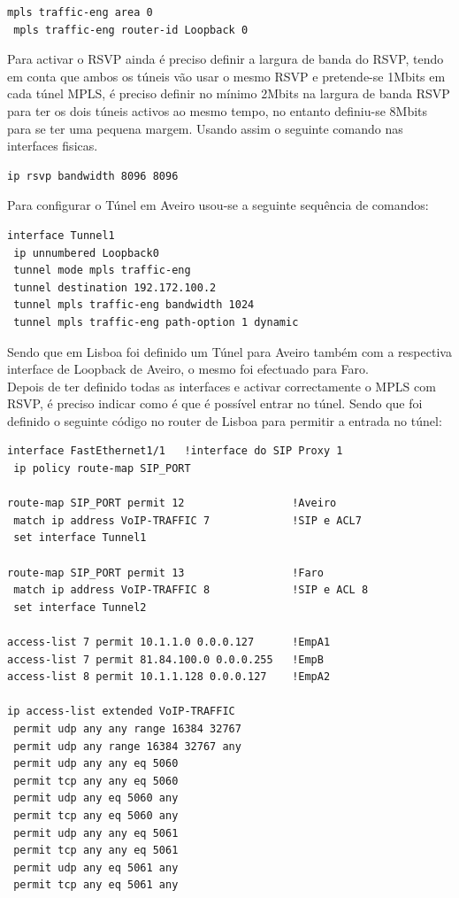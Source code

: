 \documentclass[11pt,a4paper]{report}
\begin{document}
\begin{lstlisting}[caption=MPLS Tunnel - Activar MPLS TE no OSPF]
 mpls traffic-eng area 0
 mpls traffic-eng router-id Loopback 0
\end{lstlisting}

Para activar o RSVP ainda é preciso definir a largura de banda do RSVP, tendo em conta que ambos os túneis vão usar o mesmo RSVP e pretende-se 1Mbits em cada túnel MPLS, é preciso definir no mínimo 2Mbits na largura de banda RSVP para ter os dois túneis activos ao mesmo tempo, no entanto definiu-se 8Mbits para se ter uma pequena margem. Usando assim o seguinte comando nas interfaces fisicas.\\

\begin{lstlisting}[caption=MPLS Tunnel - Activar RSVP]
ip rsvp bandwidth 8096 8096
\end{lstlisting}

Para configurar o Túnel em Aveiro usou-se a seguinte sequência de comandos:\\
\begin{lstlisting}[caption=MPLS Tunnel - Aveiro]
interface Tunnel1
 ip unnumbered Loopback0
 tunnel mode mpls traffic-eng
 tunnel destination 192.172.100.2
 tunnel mpls traffic-eng bandwidth 1024
 tunnel mpls traffic-eng path-option 1 dynamic
\end{lstlisting}

Sendo que em Lisboa foi definido um Túnel para Aveiro também com a respectiva interface de Loopback de Aveiro, o mesmo foi efectuado para Faro.\\

Depois de ter definido todas as interfaces e activar correctamente o MPLS com RSVP, é preciso indicar como é que é possível entrar no túnel. Sendo que foi definido o seguinte código no router de Lisboa para permitir a entrada no túnel:\\

\begin{lstlisting}[caption=MPLS Tunnel - Lisboa rota de entrada no túnel]
interface FastEthernet1/1 	!interface do SIP Proxy 1
 ip policy route-map SIP_PORT

route-map SIP_PORT permit 12                 !Aveiro
 match ip address VoIP-TRAFFIC 7             !SIP e ACL7
 set interface Tunnel1              

route-map SIP_PORT permit 13                 !Faro
 match ip address VoIP-TRAFFIC 8             !SIP e ACL 8
 set interface Tunnel2

access-list 7 permit 10.1.1.0 0.0.0.127      !EmpA1
access-list 7 permit 81.84.100.0 0.0.0.255   !EmpB
access-list 8 permit 10.1.1.128 0.0.0.127    !EmpA2

ip access-list extended VoIP-TRAFFIC
 permit udp any any range 16384 32767
 permit udp any range 16384 32767 any
 permit udp any any eq 5060
 permit tcp any any eq 5060
 permit udp any eq 5060 any
 permit tcp any eq 5060 any
 permit udp any any eq 5061
 permit tcp any any eq 5061
 permit udp any eq 5061 any
 permit tcp any eq 5061 any
\end{lstlisting}
\end{document}
